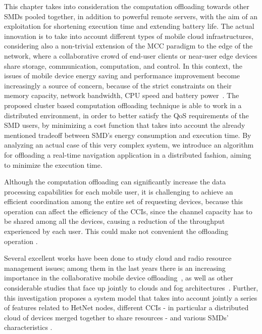 \documentclass[twoside,openright]{report}
\begin{document}
This chapter takes into consideration the computation offloading towards other \glspl{SMD} pooled together, in addition to powerful remote servers, with the aim of an exploitation for shortening execution time and extending battery life. 
The actual innovation is to take into account different types of mobile cloud infrastructures, considering also a non-trivial extension of the \gls{MCC} paradigm to the edge of the network, where a collaborative crowd of end-user clients or near-user edge devices share storage, communication, computation, and control. In this context, the issues of mobile device energy saving and performance improvement become increasingly a source of concern, because of the strict constraints on their memory capacity, network bandwidth, CPU speed and battery power~\cite{Cloud-based}.
The proposed cluster based computation offloading technique is able to work in a distributed environment, in order to better satisfy the \gls{QoS} requirements of the \gls{SMD} users, by minimizing a cost function that takes into account the already mentioned  tradeoff between \gls{SMD}'s energy consumption and execution time. 
By analyzing an actual case of this very complex system, we introduce an algorithm for offloading a real-time navigation application in a distributed fashion, aiming to minimize the execution time. 

Although the computation offloading can significantly increase the data processing capabilities for each mobile user, it is challenging to achieve an efficient coordination among the entire set of requesting devices, because this operation can affect the efficiency of the \glspl{CCI}, since the channel capacity has to be shared among all the devices, causing a reduction of the throughput experienced by each user. This could make not convenient the offloading operation \cite{GameForMCC}.

Several excellent works have been done to study cloud and radio resource management issues; among them in the last years there is an increasing importance in the collaborative mobile device offloading~\cite{Mtibaa14,Pengbo,Tzanakaki}, as well as other considerable studies that face up jointly to clouds and fog architectures~\cite{Barbarossa2014, Rosing1}. Further, this investigation proposes a system model that takes into account jointly a series of features related to \gls{HetNet}
nodes, different \glspl{CCI} -
in particular a distributed cloud of devices merged together to
share resources - and various \glspl{SMD}’ characteristics \cite{Rosing2, Rosing3}.
\end{document}
